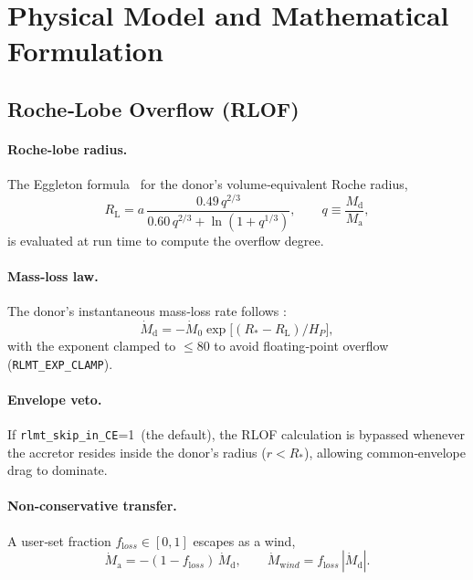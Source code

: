 \documentclass[11pt]{article}
\begin{document}
\section{Physical Model and Mathematical Formulation}

\subsection{Roche‑Lobe Overflow (RLOF)}
\label{sec:RLOF}

\paragraph{Roche‑lobe radius.}
The Eggleton formula~\cite{Eggleton1983} for the donor’s
volume‑equivalent Roche radius,
\begin{equation}
R_{\mathrm L}
 = a\,
   \frac{0.49\,q^{2/3}}{0.60\,q^{2/3}+\ln(1+q^{1/3})},
\qquad
q\equiv\frac{M_{\mathrm d}}{M_{\mathrm a}},
\label{eq:Eggleton}
\end{equation}
is evaluated at run time to compute the overflow degree.

\paragraph{Mass‑loss law.}
The donor’s instantaneous mass‑loss rate follows
\citet{Ritter1988}:
\begin{equation}
\dot M_{\mathrm d}
 = -\dot M_0
   \exp\!\bigl[(R_{*}-R_{\mathrm L})/H_P\bigr],
\label{eq:Ritter}
\end{equation}
with the exponent clamped to $\le80$ to avoid floating‑point overflow
(\texttt{RLMT\_EXP\_CLAMP}).

\paragraph{Envelope veto.} If \texttt{rlmt\_skip\_in\_CE}=1\ (the default), the RLOF calculation is bypassed whenever the accretor resides inside the donor’s radius ($r<R_*$), allowing common‑envelope drag to dominate.

\paragraph{Non‑conservative transfer.}
A user‑set fraction $f_{\mathrm loss}\in[0,1]$ escapes as a wind,
\begin{equation}
\dot M_{\mathrm a}=-(1-f_{\mathrm loss})\,\dot M_{\mathrm d},\qquad
\dot M_{\mathrm wind}=f_{\mathrm loss}\,|\dot M_{\mathrm d}|.
\label{eq:noncon}
\end{equation}
\end{document}
